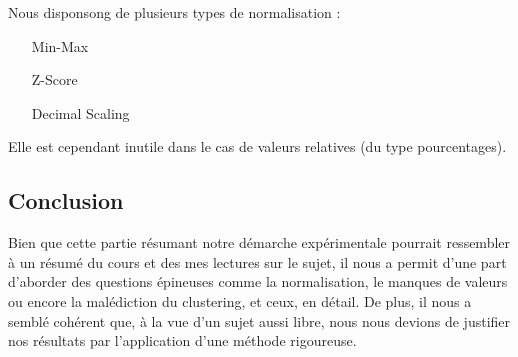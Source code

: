 Nous disponsong de plusieurs types de normalisation :
\todo{}
\begin{itemize}
	\item [Min-Max] 
	\item [Z-Score]
	\item [Decimal Scaling] 
\end{itemize}

Elle est cependant inutile dans le cas de valeurs relatives (\eg du type pourcentages).

\subsection{Conclusion}
Bien que cette partie résumant notre démarche expérimentale pourrait ressembler à un résumé du cours et des mes lectures sur le sujet, il nous a permit d'une part d'aborder des questions épineuses comme la normalisation, le manques de valeurs ou encore la malédiction du clustering, et ceux, en détail. De plus, il nous a semblé cohérent que, à la vue d'un sujet aussi libre, nous nous devions de justifier nos résultats par l'application d'une méthode rigoureuse.
